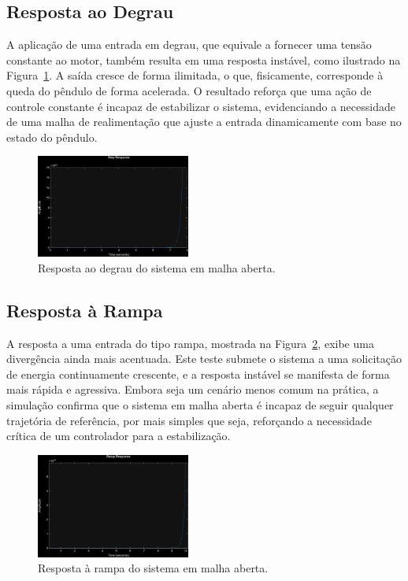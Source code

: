 \documentclass[9pt,a4paper,twocolumn,twoside]{tau-class/tau}
\begin{document}
\subsection{Resposta ao Degrau}
A aplicação de uma entrada em degrau, que equivale a fornecer uma tensão constante ao motor, também resulta em uma resposta instável, como ilustrado na Figura~\ref{fig:step}. A saída cresce de forma ilimitada, o que, fisicamente, corresponde à queda do pêndulo de forma acelerada. O resultado reforça que uma ação de controle constante é incapaz de estabilizar o sistema, evidenciando a necessidade de uma malha de realimentação que ajuste a entrada dinamicamente com base no estado do pêndulo.

\begin{figure}[H]
    \centering
    \includegraphics[width=0.45\textwidth]{figures/step_response.jpeg}
    \caption{Resposta ao degrau do sistema em malha aberta.}
    \label{fig:step}
\end{figure}

\subsection{Resposta à Rampa}
A resposta a uma entrada do tipo rampa, mostrada na Figura~\ref{fig:ramp}, exibe uma divergência ainda mais acentuada. Este teste submete o sistema a uma solicitação de energia continuamente crescente, e a resposta instável se manifesta de forma mais rápida e agressiva. Embora seja um cenário menos comum na prática, a simulação confirma que o sistema em malha aberta é incapaz de seguir qualquer trajetória de referência, por mais simples que seja, reforçando a necessidade crítica de um controlador para a estabilização.

\begin{figure}[H]
    \centering
    \includegraphics[width=0.45\textwidth]{figures/ramp_response.jpeg}
    \caption{Resposta à rampa do sistema em malha aberta.}
    \label{fig:ramp}
\end{figure}
\end{document}
